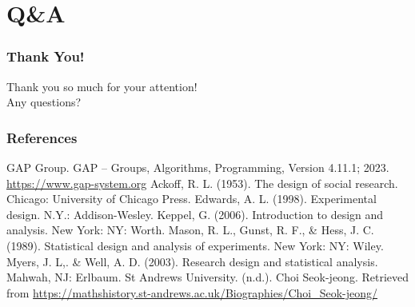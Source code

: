 \documentclass{beamer}
\begin{document}
\section{Q\&A}
\begin{frame}
	\frametitle{Thank You!}
	\centering
	\Large Thank you so much for your attention!\\[1em]
	\Large Any questions?
\end{frame}

\begin{frame}[allowframebreaks]
\frametitle{References}
\begin{thebibliography}{99}
 GAP Group. GAP -- Groups, Algorithms, Programming, Version 4.11.1; 2023. \url{https://www.gap-system.org}
 Ackoff, R. L. (1953). The design of social research. Chicago: University of Chicago Press.
 Edwards, A. L. (1998). Experimental design. N.Y.: Addison-Wesley.
 Keppel, G. (2006). Introduction to design and analysis. New York: NY: Worth.
 Mason, R. L., Gunst, R. F., \& Hess, J. C. (1989). Statistical design and analysis of experiments. New York: NY: Wiley.
 Myers, J. L,. \& Well, A. D. (2003). Research design and statistical analysis. Mahwah, NJ: Erlbaum.
 St Andrews University. (n.d.). Choi Seok-jeong. Retrieved from \url{https://mathshistory.st-andrews.ac.uk/Biographies/Choi_Seok-jeong/}
\end{thebibliography}
\end{frame}
\end{document}
